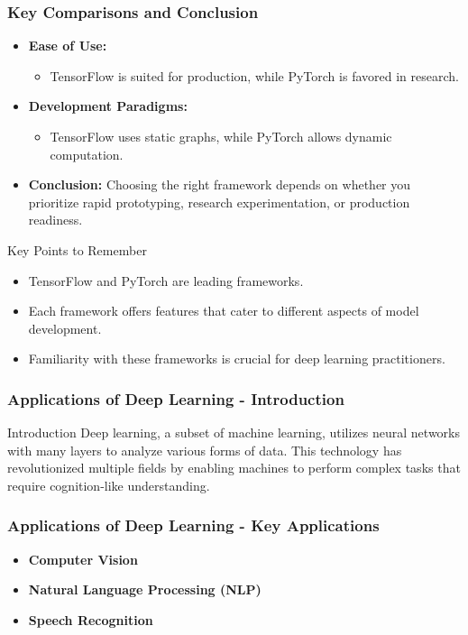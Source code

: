\documentclass[aspectratio=169]{beamer}
\begin{document}
\begin{frame}
    \frametitle{Key Comparisons and Conclusion}
    \begin{itemize}
        \item \textbf{Ease of Use:}
        \begin{itemize}
            \item TensorFlow is suited for production, while PyTorch is favored in research.
        \end{itemize}
        \item \textbf{Development Paradigms:}
        \begin{itemize}
            \item TensorFlow uses static graphs, while PyTorch allows dynamic computation.
        \end{itemize}
        \item \textbf{Conclusion:} 
        Choosing the right framework depends on whether you prioritize rapid prototyping, research experimentation, or production readiness.
    \end{itemize}
    
    \begin{block}{Key Points to Remember}
    \begin{itemize}
        \item TensorFlow and PyTorch are leading frameworks.
        \item Each framework offers features that cater to different aspects of model development.
        \item Familiarity with these frameworks is crucial for deep learning practitioners.
    \end{itemize}
    \end{block}
\end{frame}

\begin{frame}[fragile]
    \frametitle{Applications of Deep Learning - Introduction}
    \begin{block}{Introduction}
        Deep learning, a subset of machine learning, utilizes neural networks with many layers to analyze various forms of data. This technology has revolutionized multiple fields by enabling machines to perform complex tasks that require cognition-like understanding.
    \end{block}
\end{frame}

\begin{frame}[fragile]
    \frametitle{Applications of Deep Learning - Key Applications}
    \begin{itemize}
        \item \textbf{Computer Vision}
        \item \textbf{Natural Language Processing (NLP)}
        \item \textbf{Speech Recognition}
    \end{itemize}
\end{frame}
\end{document}
